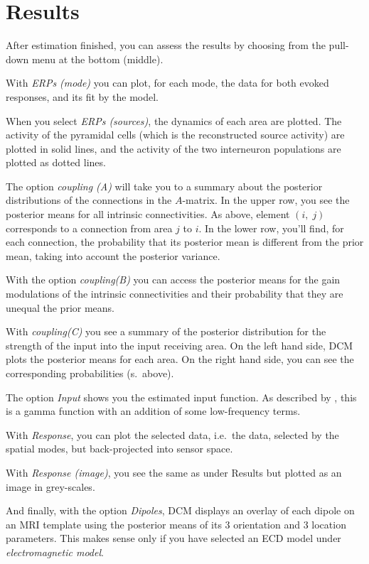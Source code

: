 \section{Results} 
After estimation finished, you can assess the results
by choosing from the pull-down menu at the bottom (middle). 

With \textit{ERPs (mode)} you can plot, for each mode, the data for
both evoked responses, and its fit by the model. 

When you select \textit{ERPs (sources)}, the dynamics of each area are
plotted. The activity of the pyramidal cells (which is the
reconstructed source activity) are plotted in solid
lines, and the activity of the two interneuron populations are plotted
as dotted lines.

The option \textit{coupling (A)} will take you to a summary about the
posterior distributions of the connections in the $A$-matrix. In the
upper row, you see the posterior means for all intrinsic
connectivities. As above, element $(i,\; j)$ corresponds to a
connection from area $j$ to $i$. In the lower row, you'll find, for
each connection, the probability that its posterior mean is different
from the prior mean, taking into account the posterior variance.

With the option \textit{coupling(B)} you can access the posterior
means for the gain modulations of the intrinsic connectivities and
their probability that they are unequal the prior means.

With \textit{coupling(C)} you see a summary of the posterior
distribution for the strength of the input into the input receiving
area. On the left hand side, DCM plots the posterior means for each
area. On the right hand side, you can see the corresponding
probabilities (s.~above).


The option \textit{Input} shows you the estimated input function. As
described by \cite{od_dcm_erp}, this is a gamma function with an
addition of some low-frequency terms.

With \textit{Response}, you can plot the selected data, i.e.~the data,
selected by the spatial modes, but back-projected into sensor space.

With \textit{Response (image)}, you see the same as under Results but
plotted as an image in grey-scales.

And finally, with the option \textit{Dipoles}, DCM displays an
overlay of each dipole on an MRI template using the posterior means of
its 3 orientation and 3 location parameters. This makes sense only if
you have selected an ECD model under \textit{electromagnetic model}.

